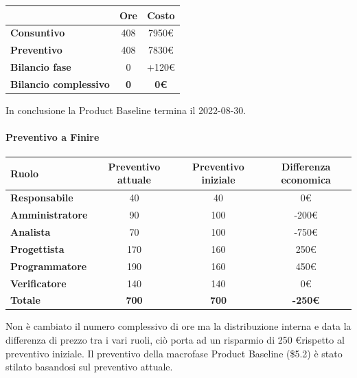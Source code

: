 \begin{center}
	\renewcommand{\arraystretch}{1.8}
	\begin{tabular}{ | l |c|c| }
    \hline
    & \textbf{Ore} & \textbf{Costo} \\
	\hline
    \textbf{Consuntivo} & 408 & 7950\euro \\
    \hline
    \textbf{Preventivo} & 408 & 7830\euro \\
    \hline
    \textbf{Bilancio fase} & 0 & +120\euro \\
    \hline
    \textbf{Bilancio complessivo} & \textbf{0} & \textbf{0\euro} \\
    \hline
    \end{tabular}
\end{center}
In conclusione la Product Baseline termina il 2022-08-30.

\newpage
\paragraph{Preventivo a Finire} \hfill \break

\begin{center}
	\renewcommand{\arraystretch}{1.8}
	\begin{tabular}{ | l |c|c|c| }
    \hline
    \textbf{Ruolo} & \textbf{Preventivo attuale} & \textbf{Preventivo iniziale}  & \textbf{Differenza economica}\\
	\hline
    \textbf{Responsabile} & 40 & 40 & 0\euro \\
    \hline
    \textbf{Amministratore} & 90 & 100 & -200\euro \\
    \hline
    \textbf{Analista} & 70 & 100 & -750\euro \\
    \hline
    \textbf{Progettista} & 170 & 160 & 250\euro \\
    \hline
    \textbf{Programmatore} & 190 & 160 & 450\euro \\
    \hline
    \textbf{Verificatore} & 140 & 140 & 0\euro \\
    \hline
    \textbf{Totale} & \textbf{700} & \textbf{700} & \textbf{-250\euro} \\
    \hline
    \end{tabular}
\end{center}
Non è cambiato il numero complessivo di ore ma la distribuzione interna e data la differenza di prezzo tra i vari ruoli, ciò porta ad un risparmio di 250 \euro rispetto al preventivo iniziale. \newline
Il preventivo della macrofase Product Baseline (\$5.2) è stato stilato basandosi sul preventivo attuale.
